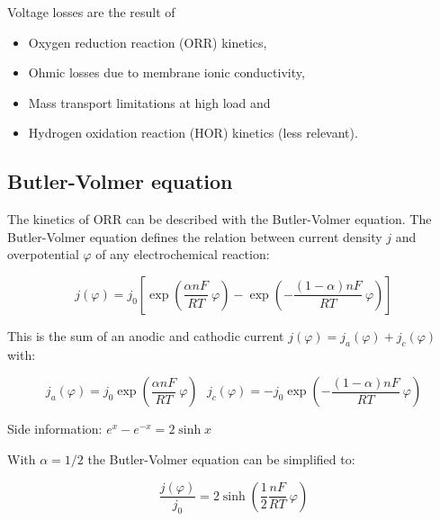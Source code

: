 \documentclass[11pt,a4paper,english,twoside]{scrreprt}
\begin{document}
Voltage losses are the result of
\begin{itemize}
	\item Oxygen reduction reaction (ORR) kinetics,
	\item Ohmic losses due to membrane ionic conductivity,
	\item Mass transport limitations at high load and
	\item Hydrogen oxidation reaction (HOR) kinetics (less relevant).
\end{itemize}



\subsection{Butler-Volmer equation}
\label{sec:ButlerVolmer}

The kinetics of ORR can be described with the Butler-Volmer equation. The Butler-Volmer equation defines the relation between current density $j$ and overpotential $\varphi$ of any electrochemical reaction:

\[
j(\varphi) = j_0 \left[\exp\left(\frac{\alpha n F}{RT}\: \varphi \right) - \exp\left(-\frac{(1-\alpha) n F}{RT}\: \varphi \right) \right]
\]

This is the sum of an anodic and cathodic current $j(\varphi) = j_a(\varphi) + j_c(\varphi)$ with:

\[
j_a(\varphi) = j_0 \exp\left(\frac{\alpha n F}{RT}\: \varphi \right) \ \ \
j_c(\varphi) = - j_0 \exp\left(-\frac{(1-\alpha) n F}{RT}\: \varphi \right)
\]

Side information: $e^x - e^{-x} = 2 \sinh x$

With $\alpha = 1/2$ the Butler-Volmer equation can be simplified to:

\[
\frac{j(\varphi)}{j_0} = 2 \sinh \left( \frac12 \frac{n F}{RT}\: \varphi \right) 
\]
\end{document}
